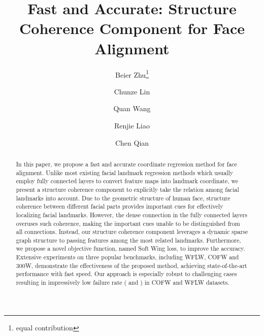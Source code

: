\documentclass[runningheads]{llncs}
\makeatletter
\newcommand{\printfnsymbol}[1]{\textsuperscript{\@fnsymbol{#1}}}
\makeatother
\begin{document}
\pagestyle{headings}
\mainmatter
\def\ECCVSubNumber{4148}  

\title{Fast and Accurate: Structure Coherence Component  for Face Alignment} 

\begin{comment}
\titlerunning{ECCV-20 submission ID \ECCVSubNumber} 
\authorrunning{ECCV-20 submission ID \ECCVSubNumber} 
\author{Anonymous ECCV submission}
\institute{Paper ID \ECCVSubNumber}
\end{comment}


\author{Beier Zhu\thanks{equal contribution} \and
Chunze Lin\printfnsymbol{1} \and
Quan Wang  \and
Renjie Liao \and 
Chen Qian }
\maketitle
\begin{abstract}
	In this paper, we propose a fast and accurate coordinate regression method for face alignment.
	Unlike most existing facial landmark regression methods which usually employ fully connected layers to convert feature maps into landmark coordinate, we present a structure coherence component to explicitly take the relation among facial landmarks into account.
	Due to the geometric structure of human face, structure coherence between different facial parts provides important cues for effectively localizing facial landmarks. 
	However, the dense connection in the fully connected layers overuses such coherence, making the important cues unable to be distinguished from all connections. 
	Instead, our structure coherence component leverages a dynamic sparse graph structure to passing features among the most related landmarks.
	Furthermore, we propose a novel objective function, named Soft Wing loss, to improve the accuracy.
	Extensive experiments on three popular benchmarks, including WFLW, COFW and 300W, demonstrate the effectiveness of the proposed method, achieving state-of-the-art performance with fast speed. Our approach is especially robust to challenging cases resulting in impressively low failure rate ( and ) in COFW and WFLW datasets.


\end{abstract}
\end{document}
